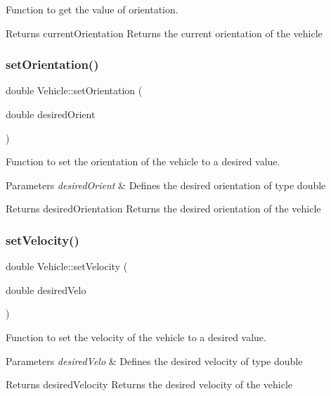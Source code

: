 Function to get the value of orientation. 

\begin{DoxyReturn}{Returns}
current\+Orientation Returns the current orientation of the vehicle 
\end{DoxyReturn}
\mbox{\label{classVehicle_a865d9ec770da73501cb7b6ed75b2f9ca}} 
\subsubsection{\texorpdfstring{set\+Orientation()}{setOrientation()}}
{\footnotesize\ttfamily double Vehicle\+::set\+Orientation (\begin{DoxyParamCaption}\item[{double}]{desired\+Orient }\end{DoxyParamCaption})}



Function to set the orientation of the vehicle to a desired value. 


\begin{DoxyParams}{Parameters}
{\em desired\+Orient} & Defines the desired orientation of type double \\
\hline
\end{DoxyParams}
\begin{DoxyReturn}{Returns}
desired\+Orientation Returns the desired orientation of the vehicle 
\end{DoxyReturn}
\mbox{\label{classVehicle_ad8f9151a22348bbfe3ff6e6a3df98f78}} 
\subsubsection{\texorpdfstring{set\+Velocity()}{setVelocity()}}
{\footnotesize\ttfamily double Vehicle\+::set\+Velocity (\begin{DoxyParamCaption}\item[{double}]{desired\+Velo }\end{DoxyParamCaption})}



Function to set the velocity of the vehicle to a desired value. 


\begin{DoxyParams}{Parameters}
{\em desired\+Velo} & Defines the desired velocity of type double \\
\hline
\end{DoxyParams}
\begin{DoxyReturn}{Returns}
desired\+Velocity Returns the desired velocity of the vehicle 
\end{DoxyReturn}
\mbox{\label{classVehicle_a4748e1fcd6fb7449ebdcf9982c4da71f}} 
